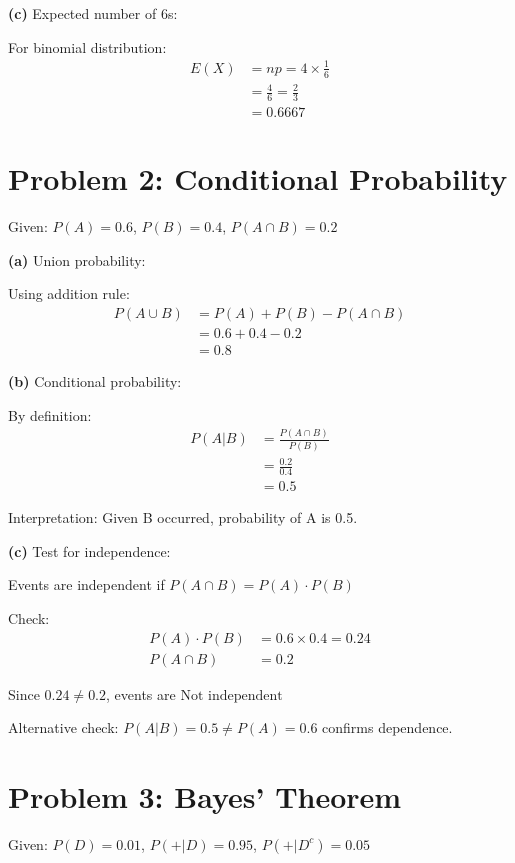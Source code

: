 \documentclass[10pt,twocolumn]{article}
\begin{document}
\textbf{(c)} Expected number of 6s:

For binomial distribution:
\begin{align*}
E(X) &= np = 4 \times \frac{1}{6} \\
&= \frac{4}{6} = \frac{2}{3} \\
&= \boxed{0.6667}
\end{align*}

\section*{Problem 2: Conditional Probability}

Given: $P(A) = 0.6$, $P(B) = 0.4$, $P(A \cap B) = 0.2$

\textbf{(a)} Union probability:

Using addition rule:
\begin{align*}
P(A \cup B) &= P(A) + P(B) - P(A \cap B) \\
&= 0.6 + 0.4 - 0.2 \\
&= \boxed{0.8}
\end{align*}

\textbf{(b)} Conditional probability:

By definition:
\begin{align*}
P(A|B) &= \frac{P(A \cap B)}{P(B)} \\
&= \frac{0.2}{0.4} \\
&= \boxed{0.5}
\end{align*}

Interpretation: Given B occurred, probability of A is 0.5.

\textbf{(c)} Test for independence:

Events are independent if $P(A \cap B) = P(A) \cdot P(B)$

Check:
\begin{align*}
P(A) \cdot P(B) &= 0.6 \times 0.4 = 0.24 \\
P(A \cap B) &= 0.2
\end{align*}

Since $0.24 \neq 0.2$, events are $\boxed{\text{Not independent}}$

Alternative check: $P(A|B) = 0.5 \neq P(A) = 0.6$ confirms dependence.

\section*{Problem 3: Bayes' Theorem}

Given: $P(D) = 0.01$, $P(+|D) = 0.95$, $P(+|D^c) = 0.05$
\end{document}
